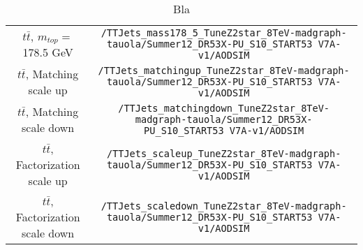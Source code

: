 \begin{sidewaystable}
\begin{tabular}{c|c}
$t\bar{t}$, $m_{top} =$ 178.5 GeV & \verb+/TTJets_mass178_5_TuneZ2star_8TeV-madgraph-tauola/Summer12_DR53X-PU_S10_START53 V7A-v1/AODSIM+ \\
$t\bar{t}$, Matching scale up & \verb+/TTJets_matchingup_TuneZ2star_8TeV-madgraph-tauola/Summer12_DR53X-PU_S10_START53 V7A-v1/AODSIM+ \\
$t\bar{t}$, Matching scale down & \verb+/TTJets_matchingdown_TuneZ2star_8TeV-madgraph-tauola/Summer12_DR53X-PU_S10_START53 V7A-v1/AODSIM+ \\
$t\bar{t}$, Factorization scale up & \verb+/TTJets_scaleup_TuneZ2star_8TeV-madgraph-tauola/Summer12_DR53X-PU_S10_START53 V7A-v1/AODSIM+ \\
$t\bar{t}$, Factorization scale down & \verb+/TTJets_scaledown_TuneZ2star_8TeV-madgraph-tauola/Summer12_DR53X-PU_S10_START53 V7A-v1/AODSIM+ \\

\end{tabular}




\caption{Bla}
\label{appTab:MCSamples}
\end{sidewaystable} 

